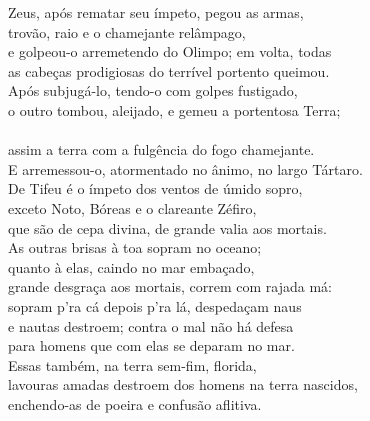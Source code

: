 \begin{pages}
\begin{Rightside}
\quad{}Zeus, após rematar seu ímpeto, pegou as armas,\\
trovão, raio e o chamejante relâmpago,\\
e golpeou-o arremetendo do Olimpo; em volta, todas \\
as cabeças prodigiosas do terrível portento queimou.\\
Após subjugá-lo, tendo-o com golpes fustigado,\\
o outro tombou, aleijado, e gemeu a portentosa Terra;\\
\\
assim  a terra com a fulgência do fogo chamejante.\\
E arremessou-o, atormentado no ânimo, no largo Tártaro.\\

\quad{}De Tifeu é o ímpeto dos ventos de úmido sopro,\\
exceto Noto, Bóreas e o clareante Zéfiro, \\
que são de cepa divina, de grande valia aos mortais.\\
As outras brisas à toa sopram no oceano;\\
quanto à elas, caindo no mar embaçado,\\
grande desgraça aos mortais, correm com rajada má:\\
sopram p'ra cá depois p'ra lá, despedaçam naus \\
e nautas destroem; contra o mal não há defesa\\
para homens que com elas se deparam no mar.\\
Essas também, na terra sem-fim, florida,\\
lavouras amadas destroem dos homens na terra nascidos,\\
enchendo-as de poeira e confusão aflitiva. \\


\end{Rightside}
\end{pages}
